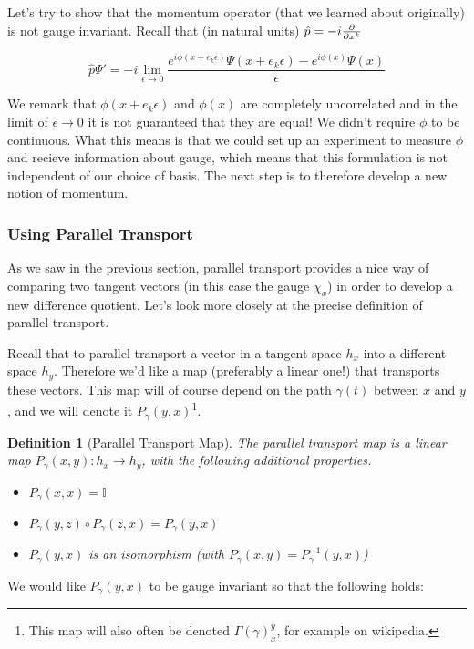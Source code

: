 \documentclass{article}
\newtheorem{defn}{Definition}
\begin{document}
Let's try to show that the momentum operator (that we learned about originally) is not gauge invariant. Recall that (in natural units) $\hat p = -i \pdv{x^k}$

\[\hat p \Psi' = -i \lim_{\epsilon \to 0}\frac{e^{i\phi(x+e_k\epsilon)}\Psi(x+e_k\epsilon) - e^{i\phi(x)}\Psi(x)}{\epsilon}\]

We remark that $\phi(x+e_k \epsilon)$ and $ \phi(x)$ are completely uncorrelated and in the limit of $\epsilon \to 0$ it is not guaranteed that they are equal! 
We didn't require $\phi$ to be continuous. What this means is that we could set up an experiment to measure $\phi$ and recieve information about gauge, which means that this formulation is not independent of our choice of basis. The next step is to therefore develop a new notion of momentum.

\subsubsection{Using Parallel Transport}

As we saw in the previous section, parallel transport provides a nice way of comparing two tangent vectors (in this case the gauge $\chi_x$) in order to develop a new difference quotient. Let's look more closely at the precise definition of parallel transport. 

Recall that to parallel transport a vector in a tangent space $h_x$ into a different space $h_y$. Therefore we'd like a map (preferably a linear one!) that transports these vectors. This map will of course depend on the path $\gamma(t)$ between $x$ and $y$, and we will denote it $P_\gamma(y,x)$\footnote{This map will also often be denoted $\Gamma(\gamma)_x^y$, for example on wikipedia.}.

\begin{defn}[Parallel Transport Map] The parallel transport map is a linear map $P_\gamma(x,y) : h_x \to h_y$, with the following additional properties.
\begin{itemize}\setlength\itemsep{0.5em}
\item$ P_\gamma(x,x) = \mathbb{I}$
\item$ P_\gamma(y,z) \circ P_\gamma(z,x) = P_\gamma(y,x)$
\item$ P_\gamma(y,x)$ is an isomorphism (with $P_\gamma(x,y)=P^{-1}_\gamma(y,x)$)
\end{itemize}
\end{defn}
 
We would like $P_\gamma(y,x)$ to be gauge invariant so that the following holds:
\end{document}
